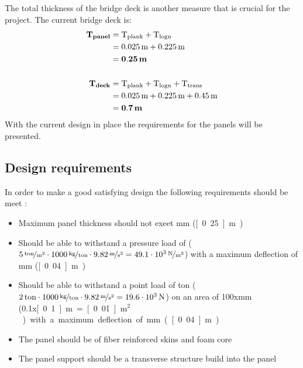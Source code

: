 \documentclass[10pt,a4paper,20pt]{article}
\begin{document}
The total thickness of the bridge deck is another measure that is crucial for the project. The current bridge deck is:
\begin{align}
\textbf{T}_{\textbf{panel}} &= \text{T}_{\text{plank}} + \text{T}_{\text{logn}} \\
& = \unit[0.025]{m} + \unit[0.225]{m} \\
& = \mathbf{\unit[0.25]{\textbf{m}}}\\
\nonumber\\
\textbf{T}_{\textbf{deck}} &= \text{T}_{\text{plank}} + \text{T}_{\text{logn}} +\text{T}_{\text{trans}} \\
& = \unit[0.025]{m} + \unit[0.225]{m} + \unit[0.45]{m} \\
& = \mathbf{\unit[0.7]{\textbf{m}}}
\end{align}
With the current design in place the requirements for the panels will be presented.

\subsection{Design requirements}
In order to make a good satisfying design the following requirements should be meet \cite{ProbDecib}:
\begin{itemize}
	\item Maximum panel thickness should not exeet \unit[250]{mm} (\unit[0.25]{m})
	\item Should be able to withstand a pressure load of  ($\unitfrac[5]{ton}{m^2}\cdot \unitfrac[1000]{kg}{ton}\cdot \unitfrac[9.82]{m}{s^2}=\unitfrac[49.1\cdot10^3]{N}{m^2}$) with a maximum deflection of \unit[40]{mm} (\unit[0.04]{m})
	\item Should be able to withstand a point load of \unit[2]{ton} ($\unit[2]{ton}\cdot \unitfrac[1000]{kg}{ton}\cdot \unitfrac[9.82]{m}{s^2}=\unit[19.6\cdot10^3]{N}$) on an area of 100x\unit[100]{mm} (0.1x\unit[0.1]{m} = \unit[0.01]{m$^2$}) with a maximum deflection of \unit[40]{mm} (\unit[0.04]{m})
	\item The panel should be of fiber reinforced skins and foam core
	\item The panel support should be a transverse structure build into the panel
\end{itemize}

\end{document}
